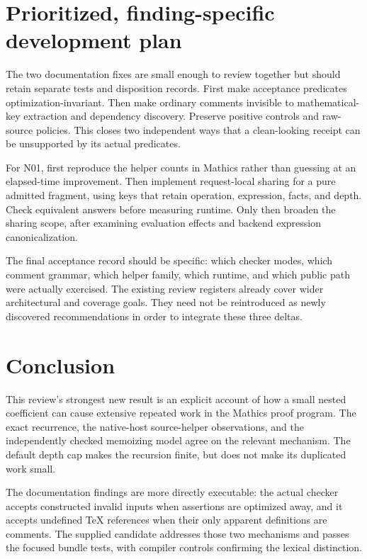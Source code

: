 \documentclass[11pt,letterpaper]{article}
\begin{document}
{\section{Prioritized, finding-specific development plan}

The two documentation fixes are small enough to review together but should retain separate tests and disposition records. First make acceptance predicates optimization-invariant. Then make ordinary comments invisible to mathematical-key extraction and dependency discovery. Preserve positive controls and raw-source policies. This closes two independent ways that a clean-looking receipt can be unsupported by its actual predicates.

For N01, first reproduce the helper counts in Mathics rather than guessing at an elapsed-time improvement. Then implement request-local sharing for a pure admitted fragment, using keys that retain operation, expression, facts, and depth. Check equivalent answers before measuring runtime. Only then broaden the sharing scope, after examining evaluation effects and backend expression canonicalization.

The final acceptance record should be specific: which checker modes, which comment grammar, which helper family, which runtime, and which public path were actually exercised. The existing review registers already cover wider architectural and coverage goals. They need not be reintroduced as newly discovered recommendations in order to integrate these three deltas.

\section{Conclusion}

This review's strongest new result is an explicit account of how a small nested coefficient can cause extensive repeated work in the Mathics proof program. The exact recurrence, the native-host source-helper observations, and the independently checked memoizing model agree on the relevant mechanism. The default depth cap makes the recursion finite, but does not make its duplicated work small.

The documentation findings are more directly executable: the actual checker accepts constructed invalid inputs when assertions are optimized away, and it accepts undefined TeX references when their only apparent definitions are comments. The supplied candidate addresses those two mechanisms and passes the focused bundle tests, with compiler controls confirming the lexical distinction.

}
\end{document}
